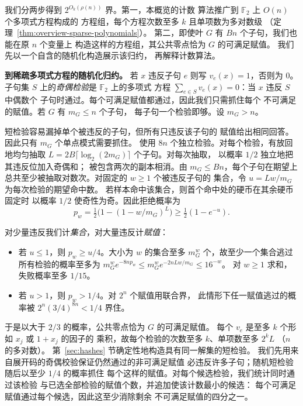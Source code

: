 \documentclass[11pt,reqno]{amsart}
\numberwithin{equation}{section}
\theoremstyle{definition}\newtheorem{definition}[theorem]{定义}
\theoremstyle{remark}\newtheorem{remark}[theorem]{注}
\renewcommand{\le}{\leqslant}
\renewcommand{\ge}{\geqslant}
\begin{document}
我们分两步得到 $2^{O_k(\rho(n))}$ 界。第一，本概览的计数
算法推广到 $\mathbb F_2$ 上 $O(n)$ 个多项式方程构成的
方程组，每个方程次数至多 $k$ 且单项数为多对数级
（定理~\ref{thm:overview-sparse-polynomials}）。
第二，即使叶 $G$ 有 $Bn$ 个子句，我们也能在原 $n$ 个变量上
构造这样的方程组，其公共零点恰为 $G$ 的可满足赋值。
我们先以一个自含的随机化构造展示该归约，
再解释计数算法。

\medskip\noindent
\textbf{到稀疏多项式方程的随机化归约。}
若 $x$ 违反子句 $e$ 则写 $v_e(x)=1$，否则为 $0$。
子句集 $S$ 上的\emph{奇偶检验}是 $\mathbb F_2$ 上的多项式
方程 $\sum_{e\in S}v_e(x)=0$：当 $x$ 违反 $S$ 中偶数个
子句时通过。每个可满足赋值都通过，因此我们只需抓住每个
不可满足的赋值。若 $G$ 有 $m_G\le n$ 个子句，
每子句一个检验即够。设 $m_G>n$。

短检验容易漏掉单个被违反的子句，但所有只违反该子句的
赋值给出相同回答。因此只有 $m_G$ 个单点模式需要抓住。
使用 $8n$ 个独立检验。对每个检验，有放回地均匀抽取
$L=2B\lceil\log_2(2m_G)\rceil$ 个子句。对每次抽取，
以概率 $1/2$ 独立地把其违反位加入奇偶和；
被包含两次的副本相消。由 $m_G\le Bn$，每个子句在期望上
总共至少被抽取对数次。对固定的 $w\ge1$ 个被违反子句的
集合，令 $u=Lw/m_G$ 为每次检验的期望命中数。
若样本命中该集合，则首个命中处的硬币在其余硬币固定时
以概率 $1/2$ 使奇性为奇。因此拒绝概率为
\[
 p_w=\tfrac12\bigl(1-(1-w/m_G)^L\bigr)\ge\tfrac12(1-e^{-u}).
\]

对少量违反我们计\emph{集合}，对大量违反计\emph{赋值}：
\begin{itemize}
\item 若 $u\le1$，则 $p_w\ge u/4$。大小为 $w$ 的集合至多
$m_G^w$ 个，故至少一个集合逃过所有检验的概率至多为
$m_G^w e^{-8np_w}\le m_G^w e^{-2nLw/m_G}\le16^{-w}$。
对 $w\ge1$ 求和，失败概率至多 $1/15$。
\item 若 $u>1$，则 $p_w>1/4$。对 $2^n$ 个赋值用联合界，
此情形下任一赋值逃过的概率被
$2^n(3/4)^{8n}<1/4$ 界住。
\end{itemize}
于是以大于 $2/3$ 的概率，公共零点恰为 $G$ 的可满足赋值。
每个 $v_e$ 是至多 $k$ 个形如 $x_j$ 或 $1+x_j$ 的因子的
乘积，故每个检验的次数至多 $k$、单项数至多 $2^kL$
（$n$ 的多对数）。
第~\ref{sec:hashes} 节确定性地构造具有同一解集的短检验。
我们先用来自展开码的奇偶校验保证仍然通过的非可满足赋值
必违反许多子句；随机短检验随后以至少 $1/4$ 的概率抓住
每个这样的赋值。对每个候选检验，我们统计同时通过该检验
与已选全部检验的赋值个数，并追加使该计数最小的候选：
每个可满足赋值通过每个候选，因此这至少消除剩余
不可满足赋值的四分之一。
\end{document}
